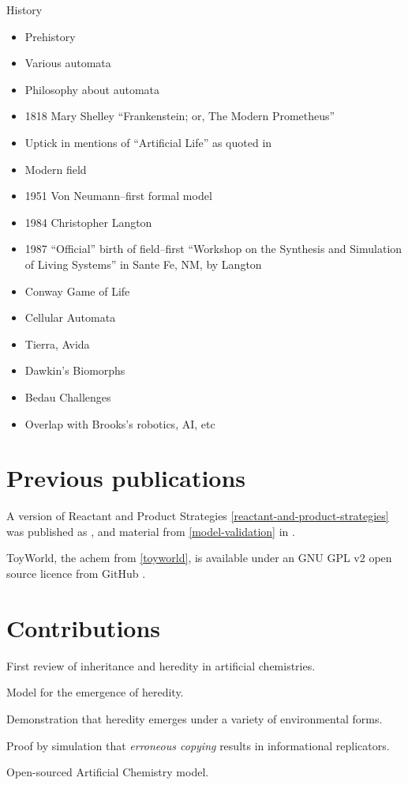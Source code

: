 \begin{NOTES}
History

\begin{itemize}
	\item Prehistory
	\item Various automata
	\item
	Philosophy about automata
	\item
	1818 Mary Shelley ``Frankenstein; or, The Modern Prometheus''
	\item
	Uptick in mentions of ``Artificial Life'' as quoted in \parencite{Aguilar2014}
	\item
	Modern field
	\item
	1951 Von Neumann--first formal model
	\item
	1984 Christopher Langton
	\item
	1987 ``Official'' birth of field--first ``Workshop on the Synthesis
	and Simulation of Living Systems'' in Sante Fe, NM, by Langton
	\item
	Conway Game of Life
	\item
	Cellular Automata
	\item
	Tierra, Avida
	\item
	Dawkin's Biomorphs
	\item
	Bedau Challenges
	\item
	Overlap with Brooks's robotics, AI, etc
\end{itemize}
\end{NOTES}

\section{Previous publications}\label{previous-publications}

A version of Reactant and Product Strategies \cref{reactant-and-product-strategies} was published as \cite{Young2015},
and material from \cref{model-validation} in \cite{Young2013}.

ToyWorld, the \gls{achem} from \ref{toyworld}, is available under an GNU GPL v2 open source licence from GitHub \cite{toyworld}.

\section{Contributions}\label{contributions}

\begin{compactenum}
\item First review of inheritance and heredity in artificial chemistries.
\item Model for the emergence of heredity.
\item Demonstration that heredity emerges under a variety of environmental forms.
\item Proof by simulation that \emph{erroneous copying} \parencite{Zachar2010} results in informational replicators.
\item Open-sourced Artificial Chemistry model.
\end{compactenum}

